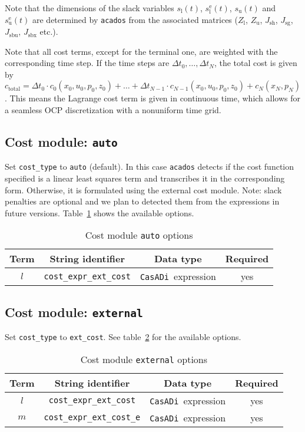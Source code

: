 \documentclass[english]{article}
\newcommand{\code}[1]{\texttt{#1}}
\newcommand{\casadi}{\texttt{CasADi}}
\newcommand{\acados}{\texttt{acados}}
\newcommand{\ind}[1]{_{\textrm{#1}}}
\newcommand{\terminal}{^{\textrm{e}}}
\newcommand{\Lower}{\ind{l}}
\newcommand{\upper}{\ind{u}}
\newcommand{\mandatory}{yes}
\begin{document}
Note that the dimensions of the slack variables $s\Lower(t)$, $s\Lower\terminal(t)$, $s\upper(t)$ and $s\upper\terminal(t)$ are determined by \acados{} from the associated matrices ($Z\Lower$, $Z\upper$,  $J\ind{sh}$, $J\ind{sg}$, $J\ind{sbu}$, $J\ind{sbx}$ etc.).

Note that all cost terms, except for the terminal one, are weighted with the corresponding time step. If the time steps are $\Delta t_0,\dots, \Delta t_N$, the total cost is given by $c_\text{total} = \Delta t_0 \cdot c_0(x_0, u_0, p_0, z_0) + \dots + \Delta t_{N-1} \cdot c_{N-1}(x_0, u_0, p_0, z_0) + c_N(x_N, p_N)$. This means the Lagrange cost term is given in continuous time, which allows for a seamless OCP discretization with a nonuniform time grid.
%
\subsection{Cost module: \code{auto}}\label{sec:cost:auto}
%
Set \code{cost\_type} to \code{auto} (default).
In this case \acados{} detects if the cost function specified is a linear least squares term and transcribes it in the corresponding form.
Otherwise, it is formulated using the external cost module.
Note: slack penalties are optional and we plan to detected them from the expressions in future versions.
Table~\ref{tab:cost:auto} shows the available options.
%
\begin{table}[ht!]
    \centering
    \caption{Cost module \code{auto} options} \label{tab:cost:auto}
    \begin{tabular}{cccc}
        \toprule
        Term & String identifier & Data type & Required \\ \midrule
        $ l $ & \code{cost\_expr\_ext\_cost}    & \casadi~expression   & \mandatory  \\ 
        \bottomrule
    \end{tabular}
\end{table}
%
\subsection{Cost module: \code{external}}\label{sec:cost:external}
%
Set \code{cost\_type} to \code{ext\_cost}. %
See table~\ref{tab:cost:external} for the available options.
\begin{table}[ht!]
    \centering
    \caption{Cost module \code{external} options} \label{tab:cost:external}
    \begin{tabular}{cccc}
        \toprule
        Term & String identifier & Data type & Required \\ \midrule
        $ l $ & \code{cost\_expr\_ext\_cost}    & \casadi~expression   & \mandatory  \\
        $ m $ & \code{cost\_expr\_ext\_cost\_e}    & \casadi~expression  & \mandatory \\
        \bottomrule
    \end{tabular}
\end{table}
%
\end{document}
